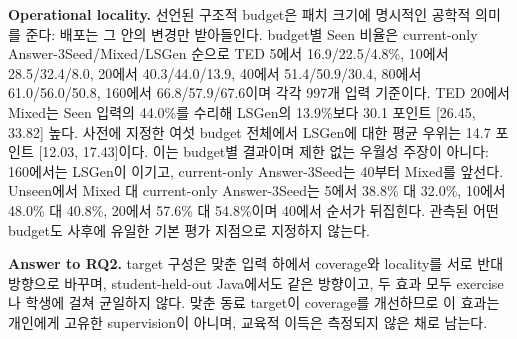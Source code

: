 \documentclass[10pt,conference]{IEEEtran}
\begin{document}
\noindent\textbf{Operational locality.} 선언된 구조적 budget은 패치 크기에 명시적인 공학적 의미를 준다: 배포는 그 안의 변경만 받아들인다. budget별 Seen 비율은 current-only Answer-3Seed/Mixed/LSGen 순으로 TED 5에서 16.9/22.5/4.8\%, 10에서 28.5/32.4/8.0, 20에서 40.3/44.0/13.9, 40에서 51.4/50.9/30.4, 80에서 61.0/56.0/50.8, 160에서 66.8/57.9/67.6이며 각각 997개 입력 기준이다. TED 20에서 Mixed는 Seen 입력의 44.0\%를 수리해 LSGen의 13.9\%보다 30.1 포인트 [26.45, 33.82] 높다. 사전에 지정한 여섯 budget 전체에서 LSGen에 대한 평균 우위는 14.7 포인트 [12.03, 17.43]이다. 이는 budget별 결과이며 제한 없는 우월성 주장이 아니다: 160에서는 LSGen이 이기고, current-only Answer-3Seed는 40부터 Mixed를 앞선다. Unseen에서 Mixed 대 current-only Answer-3Seed는 5에서 38.8\% 대 32.0\%, 10에서 48.0\% 대 40.8\%, 20에서 57.6\% 대 54.8\%이며 40에서 순서가 뒤집힌다. 관측된 어떤 budget도 사후에 유일한 기본 평가 지점으로 지정하지 않는다.

\noindent\textbf{Answer to RQ2.} target 구성은 맞춘 입력 하에서 coverage와 locality를 서로 반대 방향으로 바꾸며, student-held-out Java에서도 같은 방향이고, 두 효과 모두 exercise나 학생에 걸쳐 균일하지 않다. 맞춘 동료 target이 coverage를 개선하므로 이 효과는 개인에게 고유한 supervision이 아니며, 교육적 이득은 측정되지 않은 채로 남는다.
\end{document}

